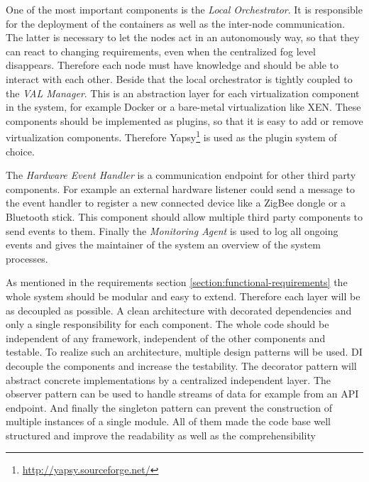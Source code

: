 One of the most important components is the \textit{Local Orchestrator}.
It is responsible for the deployment of the containers as well as the inter-node communication.
The latter is necessary to let the nodes act in an autonomously way, so that they can react to changing requirements, even when the centralized fog level disappears.
Therefore each node must have knowledge and should be able to interact with each other.
Beside that the local orchestrator is tightly coupled to the \textit{\ac{VAL} Manager}.
This is an abstraction layer for each virtualization component in the system, for example Docker or a bare-metal virtualization like XEN.
These components should be implemented as plugins, so that it is easy to add or remove virtualization components.
Therefore Yapsy\footnote{\url{http://yapsy.sourceforge.net/}} is used as the plugin system of choice.

The \textit{Hardware Event Handler} is a communication endpoint for other third party components.
For example an external hardware listener could send a message to the event handler to register a new connected device like a ZigBee dongle or a Bluetooth stick.
This component should allow multiple third party components to send events to them.
Finally the \textit{Monitoring Agent} is used to log all ongoing events and gives the maintainer of the system an overview of the system processes.

As mentioned in the requirements section \ref{section:functional-requirements} the whole system should be modular and easy to extend.
Therefore each layer will be as decoupled as possible.
A clean architecture with decorated dependencies and only a single responsibility for each component.
The whole code should be independent of any framework, independent of the other components and testable.
To realize such an architecture, multiple design patterns will be used.
\ac{DI} decouple the components and increase the testability.
The decorator pattern will abstract concrete implementations by a centralized independent layer.
The observer pattern can be used to handle streams of data for example from an \ac{API} endpoint.
And finally the singleton pattern can prevent the construction of multiple instances of a single module.
All of them made the code base well structured and improve the readability as well as the comprehensibility



